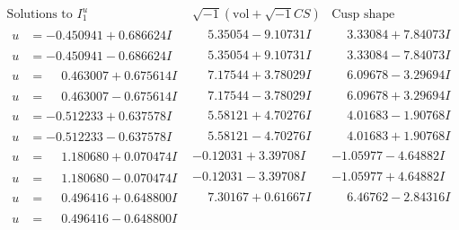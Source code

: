 \documentclass[1p]{elsarticle_modified}
\theoremstyle{definition}
\newcommand{\I}{\sqrt{-1}}
\begin{document}
$$\begin{array}{c|c|c}  
\text{Solutions to }I^u_{1}& \I (\text{vol} + \sqrt{-1}CS) & \text{Cusp shape}\\
 \hline 
\begin{aligned}
u &= -0.450941 + 0.686624 I\end{aligned}
 & \phantom{-}5.35054 - 9.10731 I & \phantom{-}3.33084 + 7.84073 I \\ \hline\begin{aligned}
u &= -0.450941 - 0.686624 I\end{aligned}
 & \phantom{-}5.35054 + 9.10731 I & \phantom{-}3.33084 - 7.84073 I \\ \hline\begin{aligned}
u &= \phantom{-}0.463007 + 0.675614 I\end{aligned}
 & \phantom{-}7.17544 + 3.78029 I & \phantom{-}6.09678 - 3.29694 I \\ \hline\begin{aligned}
u &= \phantom{-}0.463007 - 0.675614 I\end{aligned}
 & \phantom{-}7.17544 - 3.78029 I & \phantom{-}6.09678 + 3.29694 I \\ \hline\begin{aligned}
u &= -0.512233 + 0.637578 I\end{aligned}
 & \phantom{-}5.58121 + 4.70276 I & \phantom{-}4.01683 - 1.90768 I \\ \hline\begin{aligned}
u &= -0.512233 - 0.637578 I\end{aligned}
 & \phantom{-}5.58121 - 4.70276 I & \phantom{-}4.01683 + 1.90768 I \\ \hline\begin{aligned}
u &= \phantom{-}1.180680 + 0.070474 I\end{aligned}
 & -0.12031 + 3.39708 I & -1.05977 - 4.64882 I \\ \hline\begin{aligned}
u &= \phantom{-}1.180680 - 0.070474 I\end{aligned}
 & -0.12031 - 3.39708 I & -1.05977 + 4.64882 I \\ \hline\begin{aligned}
u &= \phantom{-}0.496416 + 0.648800 I\end{aligned}
 & \phantom{-}7.30167 + 0.61667 I & \phantom{-}6.46762 - 2.84316 I \\ \hline\begin{aligned}
u &= \phantom{-}0.496416 - 0.648800 I\end{aligned}

\end{array}$$
\end{document}
